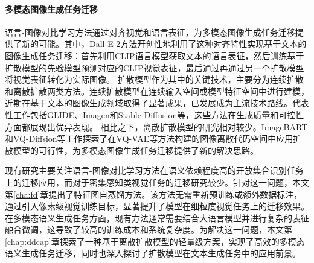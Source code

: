 \paragraph{多模态图像生成任务迁移}
语言-图像对比学习方法通过对齐视觉和语言表征，为多模态图像生成任务迁移提供了新的可能。其中，Dall-E 2方法\cite{dall-e2}开创性地利用了这种对齐特性实现基于文本的图像生成任务迁移：首先利用CLIP语言模型获取文本的语言表征，然后训练基于扩散模型的先验模型预测对应的CLIP视觉表征，最后通过再通过另一个扩散模型将视觉表征转化为实际图像。
扩散模型作为其中的关键技术，主要分为连续扩散和离散扩散两类方法。连续扩散模型\cite{beatsgan,ddpm,ddim,latentdiff}在连续输入空间或模型特征空间中进行建模，近期在基于文本的图像生成领域取得了显著成果，已发展成为主流技术路线。代表性工作包括GLIDE\cite{glide}、Imagen\cite{imagen}和Stable Diffusion\cite{latentdiff}等，这些方法在生成质量和可控性方面都展现出优异表现。
相比之下，离散扩散模型的研究相对较少。ImageBART\cite{Imagebart}和VQ-Diffsion\cite{VQ-diffusion}等工作探索了在VQ-VAE\cite{dVAE,vqvae}等方法构建的图像离散代码空间中应用扩散模型的可行性，为多模态图像生成任务迁移提供了新的解决思路。

现有研究主要关注语言-图像对比学习方法在语义依赖程度高的开放集合识别任务上的迁移应用，而对于密集感知类视觉任务的迁移研究较少。针对这一问题，本文第\ref{cha:fd}章提出了特征图自蒸馏方法。该方法无需重新预训练或额外数据标注，通过引入像素级视觉训练目标，显著提升了模型在细粒度视觉任务上的迁移效果。
在多模态语义生成任务方面，现有方法通常需要结合大语言模型并进行复杂的表征融合微调，这导致了较高的训练成本和系统复杂度。为解决这一问题，本文第\ref{chap:ddcap}章探索了一种基于离散扩散模型的轻量级方案，实现了高效的多模态语义生成任务迁移，同时也深入探讨了扩散模型在文本生成任务中的应用前景。


